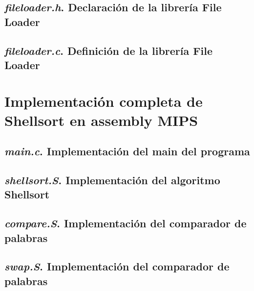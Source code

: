\documentclass{article}
\begin{document}
\begin{appendices}
\subsection{\textit{fileloader.h}. Declaración de la librería File Loader}
\lstset{ language = C } %
 
\bigskip\bigskip

\subsection{\textit{fileloader.c}. Definición de la librería File Loader}
\lstset{ language = C } %
 
\bigskip\bigskip




\section{Implementación completa de Shellsort en assembly MIPS}


\subsection{\textit{main.c}. Implementación del main del programa}
\lstset{ language = C } %
 
\bigskip\bigskip

\subsection{\textit{shellsort.S}. Implementación del algoritmo Shellsort}
%  

\subsection{\textit{compare.S}. Implementación del comparador de palabras}
%  

\subsection{\textit{swap.S}. Implementación del comparador de palabras}
%  



\end{appendices}
\end{document}
